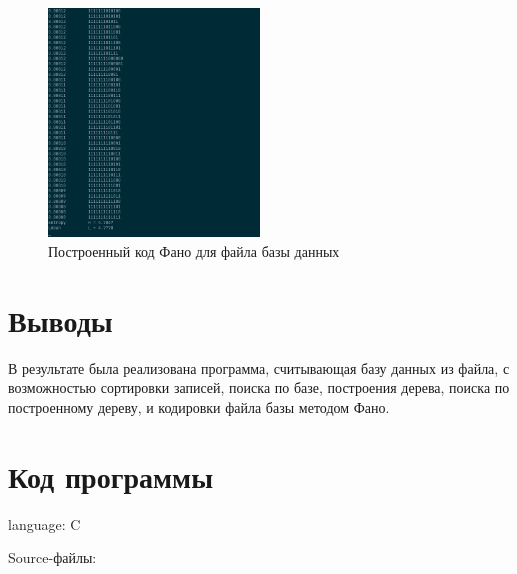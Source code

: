 \documentclass[fleqn]{article}
\begin{document}
\begin{figure}[h!]
	\includegraphics[width=0.5\textwidth]{screen3}
	\caption{Построенный код Фано для файла базы данных}
\end{figure}

\newpage

\section{Выводы}

В результате была реализована программа, считывающая базу
данных из файла, с возможностью сортировки записей, 
поиска по базе, построения дерева, поиска по построенному
дереву, и кодировки файла базы методом Фано.

\newpage

\section{Код программы}

language: C











Source-файлы:

\end{document}
